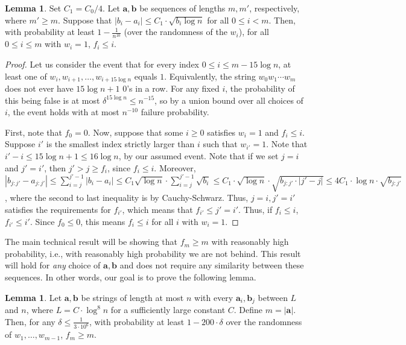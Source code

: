 \documentclass[12pt]{article}
\theoremstyle{definition}
\newtheorem{lemma}[theorem]{Lemma}
\theoremstyle{remark}
\newcommand{\ba}{\mathbf a}
\newcommand{\bb}{\mathbf b}
\begin{document}
\begin{lemma} \label{lem:not-ahead}
    Set $C_1 = C_0/4$. Let $\ba, \bb$ be sequences of lengths $m, m'$, respectively, where $m' \ge m$.
    Suppose that $|b_{i}-a_{i}| \le C_1 \cdot \sqrt{b_{i} \log n}$ for all $0 \le i < m$. Then, with probability at least $1 - \frac{1}{n^{10}}$ (over the randomness of the $w_i$), for all $0 \le i \le m$ with $w_i = 1$, $f_i \le i$.
\end{lemma}

\begin{proof}
    Let us consider the event that for every index $0 \le i \le m - 15 \log n$, at least one of $w_i, w_{i+1}, \dots, w_{i+15 \log n}$ equals $1$. Equivalently, the string $w_0 w_1 \cdots w_m$ does not ever have $15 \log n + 1$ $0$'s in a row. For any fixed $i$, the probability of this being false is at most $\delta^{15 \log n} \le n^{-15}$, so by a union bound over all choices of $i$, the event holds with at most $n^{-10}$ failure probability.

    First, note that $f_0 = 0$. Now, suppose that some $i \ge 0$ satisfies $w_i = 1$ and $f_i \le i$. Suppose $i'$ is the smallest index strictly larger than $i$ such that $w_{i'} = 1$. Note that $i'-i \le 15 \log n + 1 \le 16 \log n$, by our assumed event. Note that if we set $j = i$ and $j' = i'$, then $j' > j \ge f_i$, since $f_i \le i$.
    Moreover, $|b_{j:j'}-a_{j:j'}| \le \sum_{i=j}^{j'-1} |b_i-a_i|\le C_1 \sqrt{\log n} \cdot \sum_{i=j}^{j'-1} \sqrt{b_i} \le C_1 \cdot \sqrt{\log n} \cdot \sqrt{b_{j:j'} \cdot |j'-j|} \le 4 C_1 \cdot \log n \cdot \sqrt{b_{j:j'}}$, where the second to last inequality is by Cauchy-Schwarz. Thus, $j = i, j' = i'$ satisfies the requirements for $f_{i'}$, which means that $f_{i'} \le j' = i'$. Thus, if $f_i \le i$, $f_{i'} \le i'$. Since $f_0 \le 0$, this means $f_i \le i$ for all $i$ with $w_i = 1$.
\end{proof}

The main technical result will be showing that $f_m \ge m$ with reasonably high probability, i.e., with reasonably high probability we are not behind. This result will hold for \emph{any} choice of $\ba, \bb$ and does not require any similarity between these sequences. In other words, our goal is to prove the following lemma.

\begin{lemma} \label{lem:main-technical}
    Let $\ba, \bb$ be strings of length at most $n$ with every $\ba_i, \bb_j$ between $L$ and $n$, where $L = C \cdot \log^8 n$ for a sufficiently large constant $C$. Define $m = |\ba|$.
    Then, for any $\delta \le \frac{1}{3 \cdot 10^6}$, with probability at least $1-200 \cdot \delta$ over the randomness of $w_1, \dots, w_{m-1}$, $f_m \ge m$.
\end{lemma}
\end{document}
